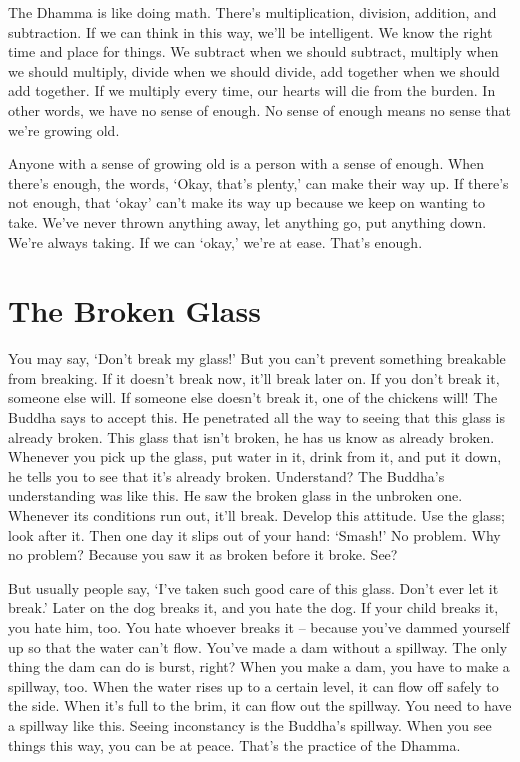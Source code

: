 The Dhamma is like doing math. There's multiplication, division, addition, and subtraction. If we can think in this way, we'll be intelligent. We know the right time and place for things. We subtract when we should subtract, multiply when we should multiply, divide when we should divide, add together when we should add together. If we multiply every time, our hearts will die from the burden. In other words, we have no sense of enough. No sense of enough means no sense that we're growing old.

Anyone with a sense of growing old is a person with a sense of enough. When there's enough, the words, `Okay, that's plenty,' can make their way up. If there's not enough, that `okay' can't make its way up because we keep on wanting to take. We've never thrown anything away, let anything go, put anything down. We're always taking. If we can `okay,' we're at ease. That's enough.

\clearpage

\section{The Broken Glass}

\enlargethispage{\baselineskip}
You may say, `Don't break my glass!' But you can't prevent something breakable from breaking. If it doesn't break now, it'll break later on. If you don't break it, someone else will. If someone else doesn't break it, one of the chickens will! The Buddha says to accept this. He penetrated all the way to seeing that this glass is already broken. This glass that isn't broken, he has us know as already broken. Whenever you pick up the glass, put water in it, drink from it, and put it down, he tells you to see that it's already broken. Understand? The Buddha's understanding was like this. He saw the broken glass in the unbroken one. Whenever its conditions run out, it'll break. Develop this attitude. Use the glass; look after it. Then one day it slips out of your hand: `Smash!' No problem. Why no problem? Because you saw it as broken before it broke. See?

But usually people say, `I've taken such good care of this glass. Don't ever let it break.' Later on the dog breaks it, and you hate the dog. If your child breaks it, you hate him, too. You hate whoever breaks it -- because you've dammed yourself up so that the water can't flow. You've made a dam without a spillway. The only thing the dam can do is burst, right? When you make a dam, you have to make a spillway, too. When the water rises up to a certain level, it can flow off safely to the side. When it's full to the brim, it can flow out the spillway. You need to have a spillway like this. Seeing inconstancy is the Buddha's spillway. When you see things this way, you can be at peace. That's the practice of the Dhamma.

